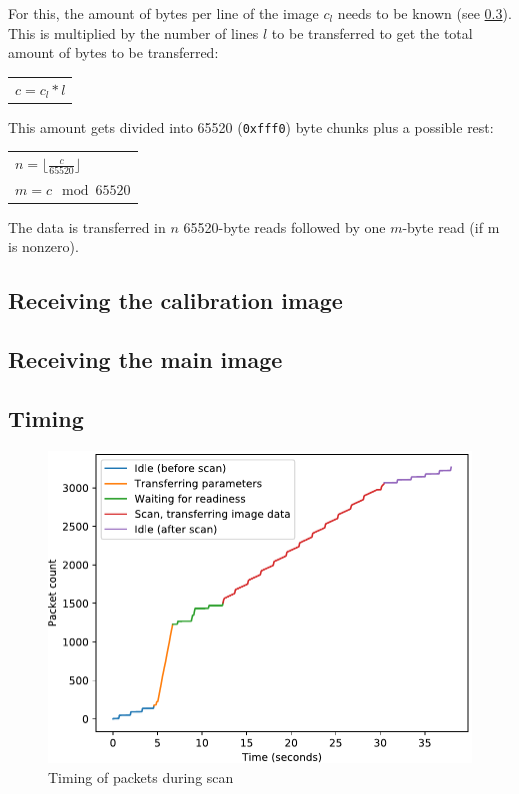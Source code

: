 \documentclass{article}
\begin{document}
For this, the amount of bytes per line of the image $c_l$ needs to be known
(see \ref{}). This is multiplied by the number of lines $l$ to be transferred
to get the total amount of bytes to be transferred:

\begin{center}
\begin{tabular}{l}
$ c = c_l * l $
\end{tabular}
\end{center}

This amount gets divided into 65520 ({\tt 0xfff0}) byte chunks plus a possible rest:

\begin{center}
\begin{tabular}{l}
$n = \lfloor \frac{c}{65520} \rfloor $ \\
$m = c \mod 65520$ \\
\end{tabular}
\end{center}

The data is transferred in $n$ 65520-byte reads followed by one $m$-byte
read (if m is nonzero).

\subsection{Receiving the calibration image}

\subsection{Receiving the main image}

\subsection{Timing}

\begin{figure}[H]
  \caption{Timing of packets during scan}
  \centering
  \includegraphics[width=\textwidth]{images/time_diagram.pdf}
\end{figure}
\end{document}
